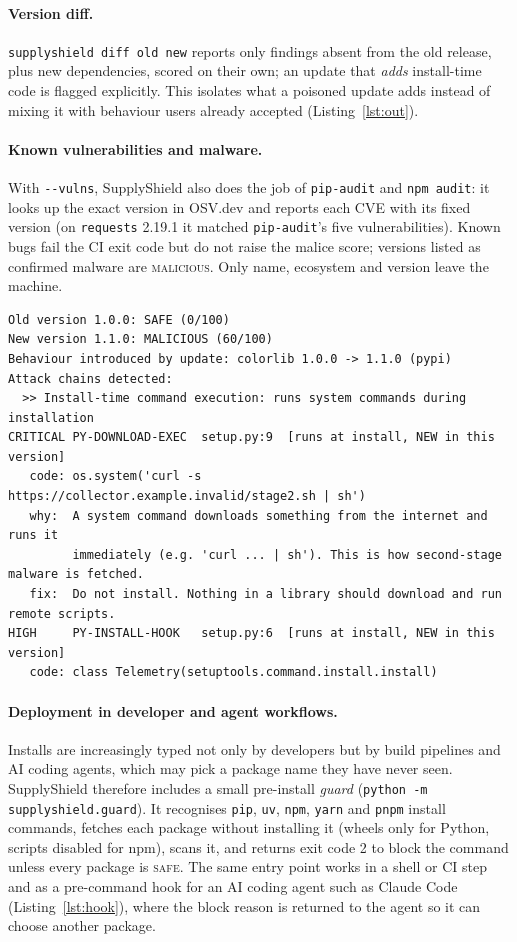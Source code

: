 \documentclass[runningheads]{llncs}
\begin{document}
\paragraph{Version diff.} \texttt{supplyshield diff old new} reports only findings absent from the old release, plus new dependencies, scored on their own; an update that \emph{adds} install-time code is flagged explicitly. This isolates what a poisoned update adds instead of mixing it with behaviour users already accepted (Listing~\ref{lst:out}).

\paragraph{Known vulnerabilities and malware.} With \texttt{-{}-vulns}, SupplyShield also does the job of \texttt{pip-audit} and \texttt{npm audit}: it looks up the exact version in OSV.dev and reports each CVE with its fixed version (on \texttt{requests} 2.19.1 it matched \texttt{pip-audit}'s five vulnerabilities). Known bugs fail the CI exit code but do not raise the malice score; versions listed as confirmed malware are \textsc{malicious}. Only name, ecosystem and version leave the machine.

\begin{lstlisting}[caption={Excerpt of \texttt{supplyshield diff} output for a poisoned update.},label={lst:out}]
Old version 1.0.0: SAFE (0/100)
New version 1.1.0: MALICIOUS (60/100)
Behaviour introduced by update: colorlib 1.0.0 -> 1.1.0 (pypi)
Attack chains detected:
  >> Install-time command execution: runs system commands during installation
CRITICAL PY-DOWNLOAD-EXEC  setup.py:9  [runs at install, NEW in this version]
   code: os.system('curl -s https://collector.example.invalid/stage2.sh | sh')
   why:  A system command downloads something from the internet and runs it
         immediately (e.g. 'curl ... | sh'). This is how second-stage malware is fetched.
   fix:  Do not install. Nothing in a library should download and run remote scripts.
HIGH     PY-INSTALL-HOOK   setup.py:6  [runs at install, NEW in this version]
   code: class Telemetry(setuptools.command.install.install)
\end{lstlisting}

\paragraph{Deployment in developer and agent workflows.} Installs are increasingly typed not only by developers but by build pipelines and AI coding agents, which may pick a package name they have never seen. SupplyShield therefore includes a small pre-install \emph{guard} (\texttt{python -m supplyshield.guard}). It recognises \texttt{pip}, \texttt{uv}, \texttt{npm}, \texttt{yarn} and \texttt{pnpm} install commands, fetches each package without installing it (wheels only for Python, scripts disabled for npm), scans it, and returns exit code 2 to block the command unless every package is \textsc{safe}. The same entry point works in a shell or CI step and as a pre-command hook for an AI coding agent such as Claude Code (Listing~\ref{lst:hook}), where the block reason is returned to the agent so it can choose another package.
\end{document}
